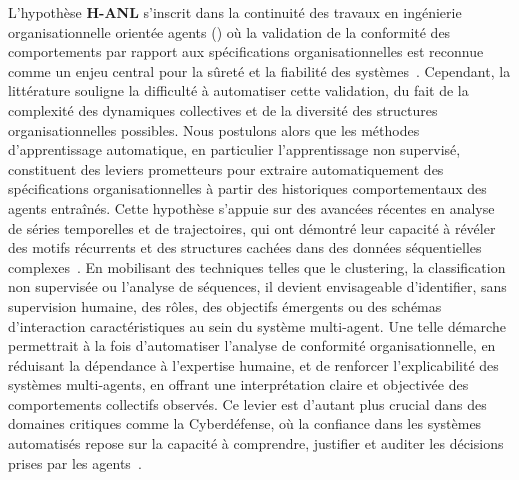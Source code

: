 \medskip

\noindent L'hypothèse \textbf{H-ANL} s'inscrit dans la continuité des travaux en ingénierie organisationnelle orientée agents () où la validation de la conformité des comportements par rapport aux spécifications organisationnelles est reconnue comme un enjeu central pour la sûreté et la fiabilité des systèmes~\cite{Boella2006, Picard2009reorganisation}. Cependant, la littérature souligne la difficulté à automatiser cette validation, du fait de la complexité des dynamiques collectives et de la diversité des structures organisationnelles possibles. Nous postulons alors que les méthodes d'apprentissage automatique, en particulier l'apprentissage non supervisé, constituent des leviers prometteurs pour extraire automatiquement des spécifications organisationnelles à partir des historiques comportementaux des agents entraînés. Cette hypothèse s'appuie sur des avancées récentes en analyse de séries temporelles et de trajectoires, qui ont démontré leur capacité à révéler des motifs récurrents et des structures cachées dans des données séquentielles complexes~\cite{Zhang2021, Gunning2019}. En mobilisant des techniques telles que le clustering, la classification non supervisée ou l'analyse de séquences, il devient envisageable d'identifier, sans supervision humaine, des rôles, des objectifs émergents ou des schémas d'interaction caractéristiques au sein du système multi-agent. Une telle démarche permettrait à la fois d'automatiser l'analyse de conformité organisationnelle, en réduisant la dépendance à l'expertise humaine, et de renforcer l'explicabilité des systèmes multi-agents, en offrant une interprétation claire et objectivée des comportements collectifs observés. Ce levier est d'autant plus crucial dans des domaines critiques comme la Cyberdéfense, où la confiance dans les systèmes automatisés repose sur la capacité à comprendre, justifier et auditer les décisions prises par les agents~\cite{Gunning2019}.

\medskip

